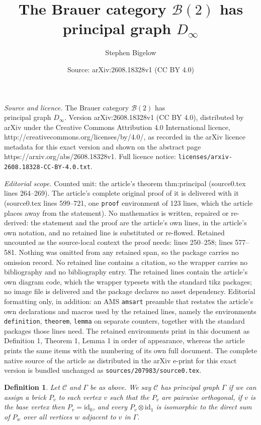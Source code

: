 \documentclass[10pt,a4paper]{amsart}
\title{The Brauer category $\mathcal{B}(2)$ has \\ principal graph $D_\infty$}
\author{Stephen Bigelow}
\date{Source: arXiv:2608.18328v1 (CC BY 4.0)}
\newtheorem{definition}{Definition}
\newcommand{\id}{\mathrm{id}}
\begin{document}
\maketitle

\noindent\emph{Source and licence.} The Brauer category $\mathcal{B}(2)$ has \\ principal graph $D_\infty$. Version arXiv:2608.18328v1 (CC BY 4.0), distributed by arXiv under the Creative Commons Attribution 4.0 International licence, http://creativecommons.org/licenses/by/4.0/, as recorded in the arXiv licence metadata for this exact version and shown on the abstract page https://arxiv.org/abs/2608.18328v1. Full licence notice: \texttt{licenses/arxiv-2608.18328-CC-BY-4.0.txt}.\par\smallskip

\noindent\textit{Editorial scope.} Counted unit: the article's theorem thm:principal (source0.tex lines 264--269). The article's complete original proof of it is delivered with it (source0.tex lines 599--721, one \texttt{proof} environment of 123 lines, which the article places away from the statement). No mathematics is written, repaired or re-derived: the statement and the proof are the article's own lines, in the article's own notation, and no retained line is substituted or re-flowed.  Retained uncounted as the source-local context the proof needs: lines 250--258; lines 577--581.  Nothing was omitted from any retained span, so the package carries no omission record.  No retained line contains a citation, so the wrapper carries no bibliography and no bibliography entry.  The retained lines contain the article's own diagram code, which the wrapper typesets with the standard tikz packages; no image file is delivered and the package declares no asset dependency.  Editorial formatting only, in addition: an AMS \texttt{amsart} preamble that restates the article's own declarations and macros used by the retained lines, namely the environments \texttt{definition}, \texttt{theorem}, \texttt{lemma} on separate counters, together with the standard packages those lines need.  The retained environments print in this document as Definition 1, Theorem 1, Lemma 1 in order of appearance, whereas the article prints the same items with the numbering of its own full document.  The complete native source of the article as distributed in the arXiv e-print for this exact version is bundled unchanged as \texttt{sources/207983/source0.tex}.
\begin{definition}
\label{def:principal}
Let $\mathcal{C}$ and $\Gamma$ be as above.  We say $\mathcal{C}$
has \emph{principal graph} $\Gamma$ if we can assign a brick $P_v$
to each vertex $v$ such that the $P_v$ are pairwise orthogonal, if $v$
is the base vertex then $P_v=\id_0$, and every $P_v \otimes \id_1$ is
isomorphic to the direct sum of $P_w$ over all vertices $w$ adjacent to
$v$ in $\Gamma$.
\end{definition}
\end{document}

